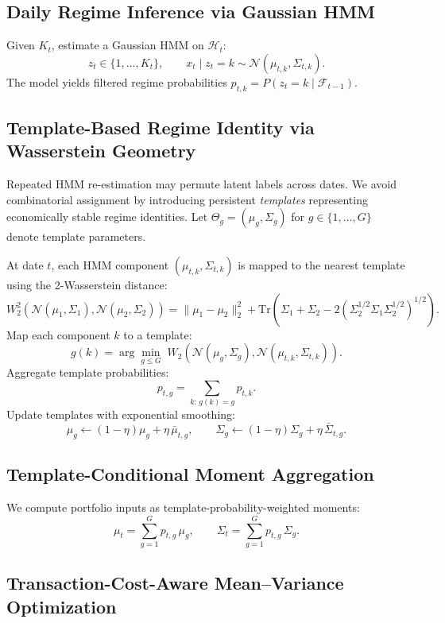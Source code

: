 \documentclass[11pt]{article}
\begin{document}
\subsection{Daily Regime Inference via Gaussian HMM}

Given $K_t$, estimate a Gaussian HMM on $\mathcal{H}_t$:
\[
z_t \in \{1,\dots,K_t\}, \qquad x_t \mid z_t=k \sim \mathcal{N}(\mu_{t,k}, \Sigma_{t,k}).
\]
The model yields filtered regime probabilities $p_{t,k}=P(z_t=k\mid \mathcal{F}_{t-1})$.

\subsection{Template-Based Regime Identity via Wasserstein Geometry}

Repeated HMM re-estimation may permute latent labels across dates.
We avoid combinatorial assignment by introducing persistent \emph{templates} representing economically stable regime identities.
Let $\Theta_g=(\mu_g,\Sigma_g)$ for $g\in\{1,\dots,G\}$ denote template parameters.

At date $t$, each HMM component $(\mu_{t,k},\Sigma_{t,k})$ is mapped to the nearest template using the 2-Wasserstein distance:
\[
W_2^2(\mathcal{N}(\mu_1,\Sigma_1), \mathcal{N}(\mu_2,\Sigma_2)) =
\|\mu_1-\mu_2\|_2^2 + \mathrm{Tr}\!\left(\Sigma_1+\Sigma_2 - 2(\Sigma_2^{1/2}\Sigma_1\Sigma_2^{1/2})^{1/2}\right).
\]
Map each component $k$ to a template:
\[
g(k) = \arg\min_{g\le G} \; W_2(\mathcal{N}(\mu_g,\Sigma_g), \mathcal{N}(\mu_{t,k},\Sigma_{t,k})).
\]
Aggregate template probabilities:
\[
p_{t,g} = \sum_{k:\,g(k)=g} p_{t,k}.
\]
Update templates with exponential smoothing:
\[
\mu_g \leftarrow (1-\eta)\mu_g + \eta\,\bar{\mu}_{t,g},\qquad
\Sigma_g \leftarrow (1-\eta)\Sigma_g + \eta\,\bar{\Sigma}_{t,g}.
\]

\subsection{Template-Conditional Moment Aggregation}

We compute portfolio inputs as template-probability-weighted moments:
\[
\mu_t = \sum_{g=1}^{G} p_{t,g}\,\mu_g,\qquad
\Sigma_t = \sum_{g=1}^{G} p_{t,g}\,\Sigma_g.
\]

\subsection{Transaction-Cost-Aware Mean--Variance Optimization}
\end{document}
